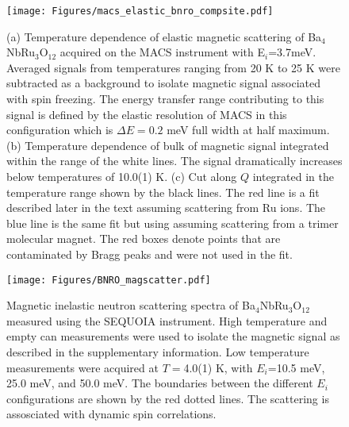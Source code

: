 \documentclass[%
 reprint,
superscriptaddress,
 amsmath,amssymb,
 aps,
 prb,
]{revtex4-2}
\begin{document}
\begin{figure}
    \hspace{-0.8cm}
    \texttt{[image: Figures/macs\_elastic\_bnro\_compsite.pdf]}
    \caption{(a) Temperature dependence of elastic magnetic scattering of Ba$_4$NbRu$_3$O$_{12}$ acquired on the MACS instrument with E$_i$=3.7meV. Averaged signals from temperatures ranging from 20 K to 25 K were subtracted as a background to isolate magnetic signal associated with spin freezing. The energy transfer range contributing to this signal is defined by the elastic resolution of MACS in this configuration which is $\Delta E=0.2$ meV full width at half maximum. (b) Temperature dependence of bulk of magnetic signal integrated within the range of the white lines. The signal dramatically increases below temperatures of 10.0(1) K. (c) Cut along $Q$ integrated in the temperature range shown by the black lines. The red line is a fit described later in the text assuming scattering from Ru ions. The blue line is the same fit but using assuming scattering from a trimer molecular magnet. The red boxes denote points that are contaminated by Bragg peaks and were not used in the fit.}
    \label{el_fig}
\end{figure}


\begin{figure}
    \texttt{[image: Figures/BNRO\_magscatter.pdf]}
    \caption{Magnetic inelastic neutron scattering spectra of Ba$_4$NbRu$_3$O$_{12}$ measured using the SEQUOIA instrument. High temperature and empty can measurements were used to isolate the magnetic signal as described in the supplementary information. Low temperature measurements were acquired at $T=$4.0(1)  K, with $E_i$=10.5 meV, 25.0 meV, and 50.0 meV. The boundaries between the different $E_i$ configurations are shown by the red dotted lines. The scattering is assosciated with dynamic spin correlations. }
    \label{inel_fig}
\end{figure}
\end{document}
